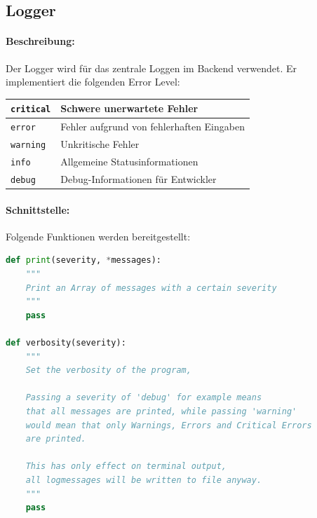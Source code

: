 \subsection{Logger}
\paragraph{Beschreibung:}
\label{par:beschreibung}


\label{sub:logger}
Der Logger wird für das zentrale Loggen im Backend verwendet. Er implementiert die folgenden Error Level:

\begin{table}[h]
\centering
\begin{tabular}{|l|l|}
    \hline
    \texttt{critical} & Schwere unerwartete Fehler \\
    \hline
    \texttt{error} & Fehler aufgrund von fehlerhaften Eingaben \\
    \hline
    \texttt{warning} & Unkritische Fehler \\
    \hline
    \texttt{info} & Allgemeine Statusinformationen \\
    \hline
    \texttt{debug} & Debug-Informationen für Entwickler \\
    \hline
\end{tabular} 
\end{table}


\paragraph{Schnittstelle:}
\label{par:schnittstelle_}



Folgende Funktionen werden bereitgestellt:
\begin{lstlisting}[language=python]
def print(severity, *messages):
    """
    Print an Array of messages with a certain severity
    """
    pass

def verbosity(severity):
    """
    Set the verbosity of the program, 

    Passing a severity of 'debug' for example means
    that all messages are printed, while passing 'warning'
    would mean that only Warnings, Errors and Critical Errors 
    are printed.

    This has only effect on terminal output,
    all logmessages will be written to file anyway.
    """
    pass
\end{lstlisting}

